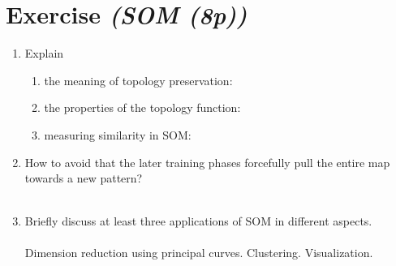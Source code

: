 \documentclass{article}
\begin{document}
\section{Exercise \textit{(SOM (8p))}}
\begin{enumerate}
    \item Explain\\
        \begin{enumerate}
            \item the meaning of topology preservation:
            \item the properties of the topology function:
            \item measuring similarity in SOM:
        \end{enumerate}
    \item How to avoid that the later training phases forcefully pull the entire
        map towards a new pattern?\\
        \\
    \item  Briefly discuss at least three applications of SOM in different aspects.\\
        \\
        Dimension reduction using principal curves.
        Clustering.
        Visualization.
\end{enumerate}
\end{document}
